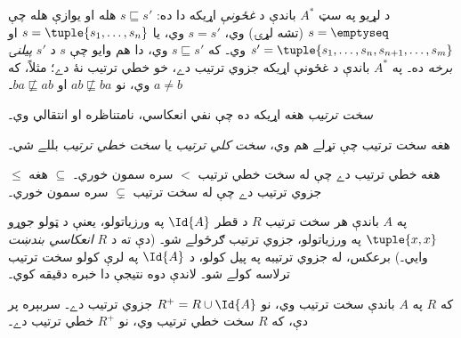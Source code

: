 \documentclass[../../../include/open-logic-section]{subfiles}
\begin{document}
\begin{ex}
د لړيو په سټ $A^*$ باندې د \emph{غځونې} اړيکه دا ده:
$s \sqsubseteq s'$ هله او يوازې هله چې $s = \emptyseq$ (تشه لړۍ)
وي، $s = s'$ وي، يا $s = \tuple{s_1, \dots, s_n}$ او
$s' = \tuple{s_1, \dots, s_n, s_{n+1}, \dots, s_m}$ وي۔ که
$s \sqsubseteq s'$ وي، دا هم وايو چې $s$ د $s'$ \emph{پيلنۍ برخه}
ده۔ په $A^*$ باندې د غځونې اړيکه جزوي ترتيب دے، خو خطي ترتيب نۀ
دے؛ مثلاً، که $a \neq b$ وي، نو $ab \not\sqsubseteq ba$ او
$ba \not\sqsubseteq ab$۔
\end{ex}

\begin{defn}
\emph{سخت ترتيب} هغه اړيکه ده چې نفي انعکاسي، نامتناظره او انتقالي وي۔
\end{defn}

\begin{defn}
هغه سخت ترتيب چې تړلے هم وي، \emph{سخت کلي ترتيب} يا
\emph{سخت خطي ترتيب} بللے شي۔
\end{defn}

\begin{ex}
$\le$ هغه خطي ترتيب دے چې له سخت خطي ترتيب $<$ سره سمون خوري۔
$\subseteq$ هغه جزوي ترتيب دے چې له سخت ترتيب $\subsetneq$ سره
سمون خوري۔
\end{ex}

په $A$ باندې هر سخت ترتيب $R$ د قطر $\Id{A}$ په ورزياتولو، يعنې
د ټولو جوړو $\tuple{x, x}$ په ورزياتولو، جزوي ترتيب ګرځولے شو۔
(دې ته د $R$ \emph{انعکاسي بندښت} وايي۔) برعکس، له جزوي ترتيبه
په پيل کولو، د $\Id{A}$ په لرې کولو سخت ترتيب ترلاسه کولے شو۔
لاندې دوه نتيجې دا خبره دقيقه کوي۔

\begin{prop}
که $R$ په $A$ باندې سخت ترتيب وي، نو $R^+ = R \cup \Id{A}$
جزوي ترتيب دے۔ سربېره پر دې، که $R$ سخت خطي ترتيب وي، نو $R^+$
خطي ترتيب دے۔
\end{prop}
\end{document}
